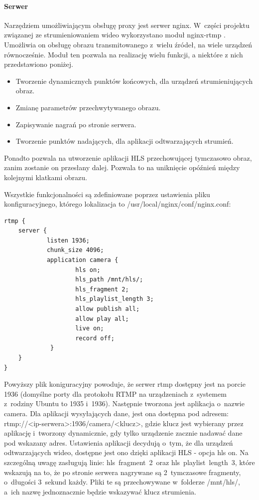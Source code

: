 \paragraph{Serwer}
Narzędziem umożliwiającym obsługę proxy jest serwer nginx. W~części projektu związanej ze strumieniowaniem wideo wykorzystano moduł nginx-rtmp \cite{NGINX}. Umożliwia on obsługę obrazu transmitowanego z~wielu źródeł, na wiele urządzeń równocześnie. 
Moduł ten pozwala na realizację wielu funkcji, a niektóre z nich przedstawiono poniżej.
\begin{itemize}
\item Tworzenie dynamicznych punktów końcowych, dla urządzeń strumieniujących obraz.
\item Zmianę parametrów przechwytywanego obrazu.
\item Zapisywanie nagrań po stronie serwera.
\item Tworzenie punktów nadających, dla aplikacji odtwarzających strumień.
\end{itemize}
Ponadto pozwala na utworzenie aplikacji HLS przechowującej tymczasowo obraz, zanim zostanie on przesłany dalej. Pozwala to na uniknięcie opóźnień między kolejnymi klatkami obrazu.

Wszystkie funkcjonalności są zdefiniowane poprzez ustawienia pliku konfiguracyjnego, którego lokalizacja to /usr/local/nginx/conf/nginx.conf:

\begin{verbatim}
rtmp {
    server {
            listen 1936;
            chunk_size 4096;
            application camera {
                    hls on;
                    hls_path /mnt/hls/;
                    hls_fragment 2;
                    hls_playlist_length 3;
                    allow publish all;
                    allow play all;
                    live on;
                    record off;
             }
    }
}
\end{verbatim}

Powyższy plik koniguracyjny powoduje, że serwer rtmp dostępny jest na porcie 1936 (domyślne porty dla protokołu RTMP na urządzeniach z~systemem z~rodziny Ubuntu to 1935 i~1936). Następnie tworzona jest aplikacja o~nazwie camera. Dla aplikacji wysyłających dane, jest ona dostępna pod adresem: rtmp://<ip-serwera>:1936/camera/<klucz>, gdzie klucz jest wybierany przez aplikację i~tworzony dynamicznie, gdy tylko urządzenie zacznie nadawać dane pod wskazany adres.
Ustawienia aplikacji decydują o~tym, że dla urządzeń odtwarzających wideo, dostępne jest ono dzięki aplikacji HLS - opcja hls on. Na szczególną uwagę zasługują linie: hls~fragment~2~oraz hls~playlist~length~3, które wskazują na to, że po stronie serwera nagrywane są 2~tymczasowe fragmenty, o~długości 3~sekund każdy. Pliki te są przechowywane w~folderze /mnt/hls/, a~ich nazwę jednoznacznie będzie wskazywać klucz strumienia.

